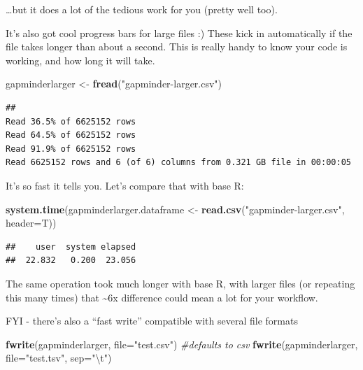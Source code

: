 \documentclass[]{article}
\newenvironment{Shaded}{\begin{snugshade}}{\end{snugshade}}
\newcommand{\KeywordTok}[1]{\textcolor[rgb]{0.13,0.29,0.53}{\textbf{{#1}}}}
\newcommand{\DataTypeTok}[1]{\textcolor[rgb]{0.13,0.29,0.53}{{#1}}}
\newcommand{\CharTok}[1]{\textcolor[rgb]{0.31,0.60,0.02}{{#1}}}
\newcommand{\StringTok}[1]{\textcolor[rgb]{0.31,0.60,0.02}{{#1}}}
\newcommand{\CommentTok}[1]{\textcolor[rgb]{0.56,0.35,0.01}{\textit{{#1}}}}
\newcommand{\NormalTok}[1]{{#1}}
\begin{document}
\ldots{}but it does a lot of the tedious work for you (pretty well too).

It's also got cool progress bars for large files :) These kick in
automatically if the file takes longer than about a second. This is
really handy to know your code is working, and how long it will take.

\begin{Shaded}
\begin{Highlighting}[]
\NormalTok{gapminderlarger <-}\StringTok{ }\KeywordTok{fread}\NormalTok{(}\StringTok{"gapminder-larger.csv"}\NormalTok{)}
\end{Highlighting}
\end{Shaded}

\begin{verbatim}
## 
Read 36.5% of 6625152 rows
Read 64.5% of 6625152 rows
Read 91.9% of 6625152 rows
Read 6625152 rows and 6 (of 6) columns from 0.321 GB file in 00:00:05
\end{verbatim}

It's so fast it tells you. Let's compare that with base R:

\begin{Shaded}
\begin{Highlighting}[]
\KeywordTok{system.time}\NormalTok{(gapminderlarger.dataframe <-}\StringTok{ }\KeywordTok{read.csv}\NormalTok{(}\StringTok{"gapminder-larger.csv"}\NormalTok{, }\DataTypeTok{header=}\NormalTok{T))}
\end{Highlighting}
\end{Shaded}

\begin{verbatim}
##    user  system elapsed 
##  22.832   0.200  23.056
\end{verbatim}

The same operation took much longer with base R, with larger files (or
repeating this many times) that \textasciitilde{}6x difference could
mean a lot for your workflow.

FYI - there's also a ``fast write'' compatible with several file formats

\begin{Shaded}
\begin{Highlighting}[]
\KeywordTok{fwrite}\NormalTok{(gapminderlarger, }\DataTypeTok{file=}\StringTok{"test.csv"}\NormalTok{) }\CommentTok{#defaults to csv}
\KeywordTok{fwrite}\NormalTok{(gapminderlarger, }\DataTypeTok{file=}\StringTok{"test.tsv"}\NormalTok{, }\DataTypeTok{sep=}\StringTok{"}\CharTok{\textbackslash{}t}\StringTok{"}\NormalTok{)}
\end{Highlighting}
\end{Shaded}
\end{document}
